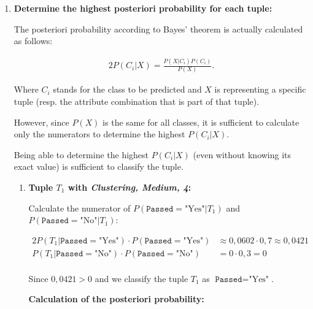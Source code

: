 \documentclass[
english,
smallborders
]{i6prcsht}
\newcommand{\BayesNumerator}[3]{P(#1 | \texttt{#2}=\text{"#3"}) \cdot P(\texttt{#2}=\text{"#3"})}
\newcommand{\PosterioriProbability}[3]{P(\texttt{#2}=\text{"#3"} | #1)}
\newcommand{\ResultClass}[2]{\texttt{#1}=\text{"#2"}}
\begin{document}
\begin{solution}
\begin{enumerate}
		\item \textbf{Determine the highest posteriori probability for each tuple:}
		      
		      The posteriori probability according to Bayes' theorem is actually calculated as follows:
		      
		      \begin{alignat*}{2}
			      P(C_i|X) = \frac{P(X|C_i)P(C_i)}{P(X)}.
		      \end{alignat*}
		      
		      Where $C_i$ stands for the class to be predicted and $X$ is representing a specific tuple (resp. the attribute combination that is part of that tuple).
		      
		      However, since $P(X)$ is the same for all classes, it is sufficient to calculate only the numerators to determine the highest $P(C_i|X)$.
		      
		      Being able to determine the highest $P(C_i|X)$ (even without knowing its exact value) is sufficient to classify the tuple.
		      
		      \begin{enumerate}	
			      \item \textbf{Tuple $T_1$ with \textit{Clustering, Medium, 4}:}
			            
			            Calculate the numerator of $\PosterioriProbability{T_1}{Passed}{Yes}$ and $\PosterioriProbability{T_1}{Passed}{No}$:
			            
			            \begin{alignat*}{2}
				            \BayesNumerator{T_1}{Passed}{Yes} & \approx 0,0602 \cdot 0,7 \approx 0,0421 \\
				            \BayesNumerator{T_1}{Passed}{No}  & = 0 \cdot 0,3 = 0                       \\
			            \end{alignat*}
			            
			            Since $0,0421 > 0$ and we classify the tuple $T_1$ as $\ResultClass{Passed}{Yes}$.
			            
			            \vspace*{3em}
			            
			            \begin{mdframed}[linecolor=solutioncolor]
				            \color{solutioncolor}
				            \begin{em}	
					            \textbf{Calculation of the posteriori probability:}
					            

\end{em}
\end{mdframed}
\end{enumerate}
\end{enumerate}
\end{solution}
\end{document}
